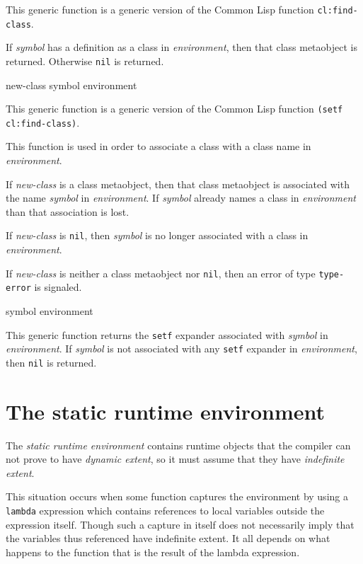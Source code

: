 This generic function is a generic version of the Common Lisp function
\texttt{cl:find-class}.

If \textit{symbol} has a definition as a class in
\textit{environment}, then that class metaobject is returned.
Otherwise \texttt{nil} is returned.

 {new-class symbol environment}

This generic function is a generic version of the Common Lisp function
\texttt{(setf cl:find-class)}.

This function is used in order to associate a class with a class name
in \textit{environment}.

If \textit{new-class} is a class metaobject, then that class
metaobject is associated with the name \textit{symbol} in
\textit{environment}.  If \textit{symbol} already names a class in
\textit{environment} than that association is lost.

If \textit{new-class} is \texttt{nil}, then \textit{symbol} is no
longer associated with a class in \textit{environment}.

If \textit{new-class} is neither a class metaobject nor \texttt{nil},
then an error of type \texttt{type-error} is signaled.

 {symbol environment}

This generic function returns the \texttt{setf} expander associated
with \textit{symbol} in \textit{environment}.  If \textit{symbol} is
not associated with any \texttt{setf} expander in
\textit{environment}, then \texttt{nil} is returned.

\section{The static runtime environment}
\label{sec-environments-static-runtime}

The \emph{static runtime environment} contains runtime objects that
the compiler can not prove to have \emph{dynamic extent}, so it must
assume that they have \emph{indefinite extent}.  

This situation occurs when some function captures the environment by
using a \texttt{lambda} expression which contains references to local
variables outside the expression itself.  Though such a capture in
itself does not necessarily imply that the variables thus referenced
have indefinite extent.  It all depends on what happens to the
function that is the result of the lambda expression.  

